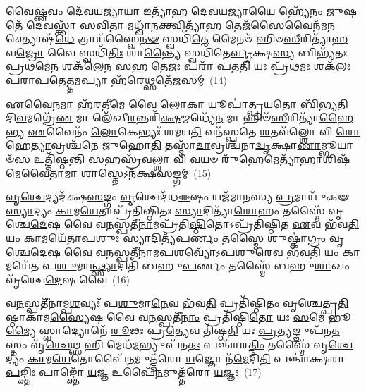 \-\ul{𑌵𑍈}\-\-\ul{𑌷𑍍𑌣}\-𑌵𑌂 𑌦𑍇᳴𑌵\-\ul{𑌯}\-𑌜𑍍𑌯𑌾\-\ul{𑌯𑌾} 𑌇𑌤𑍍𑌯𑌾᳴𑌹 𑌦𑍇𑌵\-\ul{𑌯}\-𑌜𑍍𑌯𑌾\-\ul{𑌯𑍈} 𑌹𑍍𑌯𑍇᳴𑌨𑌂 \ul{𑌜𑍁}\-𑌷𑌤𑍇᳴ \ul{𑌦𑍇}\-𑌵𑌸𑍍𑌤𑍍𑌵𑌾᳴ 𑌸\-\ul{𑌵𑌿}\-𑌤𑌾 𑌮𑌧𑍍𑌵𑌾᳴\-\ul{𑌨}\-𑌕𑍍𑌤𑍍𑌵𑌿𑌤𑍍𑌯𑌾᳴\-\ul{𑌹} 𑌤𑍇𑌜᳴\-\ul{𑌸𑍈}\-𑌵𑍈𑌨᳴𑌮\-\ul{𑌨}\-𑌕𑍍𑌤𑍍𑌯𑍋𑌷᳴\-\ul{𑌧𑍇} 𑌤𑍍𑌰𑌾𑌯᳴𑌸𑍍𑌵𑍈\-\ul{𑌨}\-\-\ul{𑍟} 𑌸𑍍𑌵𑌧𑌿᳴\-\ul{𑌤𑍇} 𑌮𑍈𑌨𑍞᳴ 𑌹𑌿𑍞\-\ul{𑌸𑍀}\-𑌰𑌿𑌤𑍍𑌯𑌾᳴\-\ul{𑌹} 𑌵\-\ul{𑌜𑍍𑌰𑍋} 𑌵𑍈 𑌸𑍍𑌵𑌧𑌿᳴\-\ul{𑌤𑌿𑌃} 𑌶𑌾\-\ul{𑌨𑍍𑌤𑍍𑌯𑍈} 𑌸𑍍𑌵𑌧𑌿᳴𑌤𑍇\-\ul{𑌰𑍍𑌵𑍃}\-𑌕𑍍𑌷\-\ul{𑌸𑍍𑌯} 𑌬𑌿𑌭𑍍𑌯᳴𑌤𑌃 𑌪𑍍𑌰\-\ul{𑌥}\-𑌮𑍇\-\ul{𑌨} 𑌶𑌕᳴𑌲𑍇𑌨 \ul{𑌸}\-𑌹 𑌤𑍇\-\ul{𑌜𑌃} 𑌪𑌰𑌾᳴ 𑌪𑌤\-\ul{𑌤𑌿} 𑌯𑌃 𑌪𑍍𑌰᳴\-\ul{𑌥}\-𑌮𑌃 𑌶𑌕᳴𑌲𑌃 𑌪\-\ul{𑌰𑌾}\-𑌪\-\ul{𑌤𑍇}\-𑌤𑍍𑌤𑌮𑌪𑍍𑌯𑌾 𑌹᳴\-\ul{𑌰𑍇}\-𑌥𑍍𑌸𑌤𑍇᳴𑌜𑌸𑌮𑍍~(14)

\-\ul{𑌏}\-𑌵𑍈\-\ul{𑌨}\-𑌮𑌾 𑌹᳴𑌰\-\ul{𑌤𑍀}\-𑌮𑍇 𑌵𑍈 \ul{𑌲𑍋}\-𑌕𑌾 𑌯𑍂𑌪𑌾॑𑌤𑍍𑌪𑍍𑌰\-\ul{𑌯}\-𑌤𑍋 𑌬𑌿᳴𑌭𑍍𑌯\-\ul{𑌤𑌿} 𑌦𑌿\-\ul{𑌵}\-𑌮𑌗𑍍𑌰𑍇᳴\-\ul{𑌣} 𑌮𑌾 𑌲𑍇᳴𑌖𑍀\-\ul{𑌰}\-𑌨𑍍𑌤𑌰𑌿᳴\-\ul{𑌕𑍍𑌷}\-𑌮𑍍𑌮𑌧𑍍𑌯𑍇᳴\-\ul{𑌨} 𑌮𑌾 𑌹𑌿𑍞᳴\-\ul{𑌸𑍀}\-𑌰𑌿𑌤𑍍𑌯𑌾᳴\-\ul{𑌹𑍈}\-𑌭𑍍𑌯 \ul{𑌏}\-𑌵𑍈𑌨𑌂᳴ \ul{𑌲𑍋}\-𑌕𑍇𑌭𑍍𑌯𑌃᳴ 𑌶𑌮𑌯\-\ul{𑌤𑌿} 𑌵𑌨᳴𑌸𑍍𑌪𑌤𑍇 \ul{𑌶}\-𑌤𑌵᳴𑌲𑍍\mbox{}\-\ul{𑌶𑍋} 𑌵𑌿 \ul{𑌰𑍋}\-𑌹𑍇\-\ul{𑌤𑍍𑌯𑌾}\-𑌵𑍍𑌰𑌶𑍍𑌚᳴𑌨𑍇 𑌜𑍁𑌹𑍋\-\ul{𑌤𑌿} 𑌤𑌸𑍍𑌮𑌾᳴\-\ul{𑌦𑌾}\-𑌵𑍍𑌰𑌶𑍍𑌚᳴𑌨𑌾\-\ul{𑌦𑍍𑌵𑍃}\-𑌕𑍍𑌷𑌾\-\ul{𑌣𑌾}\-𑌮𑍍𑌭𑍂𑌯𑌾𑍞᳴\-\ul{𑌸} 𑌉𑌤𑍍𑌤𑌿᳴𑌷𑍍𑌠𑌨𑍍𑌤𑌿 \ul{𑌸}\-𑌹𑌸𑍍𑌰᳴𑌵𑌲𑍍\mbox{}\-\ul{𑌶𑌾} 𑌵𑌿 \ul{𑌵}\-𑌯𑍞 𑌰𑍁᳴\-\ul{𑌹𑍇}\-𑌮𑍇𑌤𑍍𑌯𑌾᳴\-\ul{𑌹𑌾}\-𑌶𑌿𑌷᳴\-\ul{𑌮𑍇}\-𑌵𑍈𑌤𑌾𑌮𑌾 \ul{𑌶𑌾}\-𑌸𑍍𑌤𑍇\-𑌽𑌨᳴𑌕𑍍𑌷𑌸𑌙𑍍𑌗𑌮𑍍~(15)

\-\ul{𑌵𑍃}\-\-\ul{𑌶𑍍𑌚𑍇}\-𑌦𑍍𑌯𑌦᳴𑌕𑍍𑌷\-\ul{𑌸}\-𑌙𑍍𑌗𑌂 \ul{𑌵𑍃}\-𑌶𑍍𑌚𑍇𑌦᳴𑌧\-\ul{𑌈}\-𑌷𑌂 𑌯𑌜᳴𑌮𑌾𑌨𑌸𑍍𑌯 \ul{𑌪𑍍𑌰}\-𑌮𑌾𑌯𑍁᳴𑌕𑍟 \ul{𑌸𑍍𑌯𑌾}\-𑌦𑍍𑌯𑌂 \ul{𑌕𑌾}\-𑌮\-\ul{𑌯𑍇}\-𑌤𑌾𑌪𑍍𑌰᳴𑌤𑌿𑌷𑍍𑌠𑌿𑌤𑌃 \ul{𑌸𑍍𑌯𑌾}\-𑌦𑌿𑌤𑍍𑌯𑌾᳴\-\ul{𑌰𑍋}\-𑌹𑌂 𑌤𑌸𑍍𑌮𑍈᳴ 𑌵𑍃𑌶𑍍𑌚𑍇\-\ul{𑌦𑍇}\-𑌷 𑌵𑍈 𑌵\-\ul{𑌨}\-𑌸𑍍𑌪𑌤𑍀᳴\-\ul{𑌨𑌾}\-𑌮𑌪𑍍𑌰᳴𑌤𑌿\-\ul{𑌷𑍍𑌠𑌿}\-𑌤𑍋\-𑌽𑌪𑍍𑌰᳴𑌤𑌿𑌷𑍍𑌠𑌿𑌤 \ul{𑌏}\-𑌵 𑌭᳴𑌵\-\ul{𑌤𑌿} 𑌯𑌂 \ul{𑌕𑌾}\-𑌮𑌯𑍇᳴𑌤𑌾\-\ul{𑌪}\-𑌶𑍁𑌃 \ul{𑌸𑍍𑌯𑌾}\-𑌦𑌿𑌤𑍍𑌯᳴\-\ul{𑌪}\-𑌰𑍍𑌣𑌂 𑌤\-\ul{𑌸𑍍𑌮𑍈} 𑌶𑍁𑌷𑍍𑌕𑌾॑𑌗𑍍𑌰𑌂 𑌵𑍃𑌶𑍍𑌚𑍇\-\ul{𑌦𑍇}\-𑌷 𑌵𑍈 𑌵\-\ul{𑌨}\-𑌸𑍍𑌪𑌤𑍀᳴𑌨𑌾𑌮𑌪\-\ul{𑌶}\-𑌵𑍍𑌯𑍋᳴\-𑌽\-\ul{𑌪}\-𑌶𑍁\-\ul{𑌰𑍇}\-𑌵 𑌭᳴𑌵\-\ul{𑌤𑌿} 𑌯𑌂 \ul{𑌕𑌾}\-𑌮𑌯𑍇᳴𑌤 𑌪\-\ul{𑌶𑍁}\-𑌮𑌾\-\ul{𑌨𑍍𑌥𑍍𑌸𑍍𑌯𑌾}\-𑌦𑌿𑌤𑌿᳴ 𑌬𑌹𑍁\-\ul{𑌪}\-𑌰𑍍𑌣𑌂 𑌤𑌸𑍍𑌮𑍈᳴ 𑌬𑌹𑍁\-\ul{𑌶𑌾}\-𑌖𑌂 𑌵𑍃᳴𑌶𑍍𑌚𑍇\-\ul{𑌦𑍇}\-𑌷 𑌵𑍈~(16)

𑌵\-\ul{𑌨}\-𑌸𑍍𑌪𑌤𑍀᳴𑌨𑌾𑌮𑍍𑌪\-\ul{𑌶}\-𑌵𑍍𑌯𑌃᳴ 𑌪\-\ul{𑌶𑍁}\-𑌮𑌾\-\ul{𑌨𑍇}\-𑌵 𑌭᳴𑌵\-\ul{𑌤𑌿} 𑌪𑍍𑌰𑌤𑌿᳴𑌷𑍍𑌠𑌿𑌤𑌂 𑌵𑍃𑌶𑍍𑌚𑍇𑌤𑍍𑌪𑍍𑌰\-\ul{𑌤𑌿}\-𑌷𑍍𑌠𑌾𑌕𑌾᳴𑌮\-\ul{𑌸𑍍𑌯𑍈}\-𑌷 𑌵𑍈 𑌵\-\ul{𑌨}\-𑌸𑍍𑌪𑌤𑍀᳴\-\ul{𑌨𑌾𑌂} 𑌪𑍍𑌰𑌤𑌿᳴𑌷𑍍𑌠𑌿\-\ul{𑌤𑍋} 𑌯𑌃 \ul{𑌸}\-𑌮𑍇 𑌭𑍂\-\ul{𑌮𑍍𑌯𑍈} 𑌸𑍍𑌵𑌾𑌦𑍍𑌯𑍋𑌨𑍇᳴ \ul{𑌰𑍂}\-𑌢𑌃 𑌪𑍍𑌰\-\ul{𑌤𑍍𑌯𑍇}\-𑌵 𑌤𑌿᳴𑌷𑍍𑌠\-\ul{𑌤𑌿} 𑌯𑌃 \ul{𑌪𑍍𑌰}\-𑌤𑍍𑌯𑌙𑍍𑌙𑍁𑌪᳴𑌨\-\ul{𑌤}\-𑌸𑍍𑌤𑌂 𑌵𑍃᳴\-\ul{𑌶𑍍𑌚𑍇}\-𑌥𑍍𑌸 𑌹𑌿 𑌮𑍇𑌧᳴\-\ul{𑌮}\-𑌭𑍍𑌯𑍁𑌪᳴𑌨\-\ul{𑌤𑌃} 𑌪𑌞𑍍𑌚𑌾᳴𑌰\-\ul{𑌤𑍍𑌨𑌿𑌂} 𑌤𑌸𑍍𑌮𑍈᳴ 𑌵𑍃\-\ul{𑌶𑍍𑌚𑍇}\-𑌦𑍍𑌯𑌂 \ul{𑌕𑌾}\-𑌮\-\ul{𑌯𑍇}\-𑌤𑍋𑌪𑍈᳴\-\ul{𑌨}\-𑌮𑍁𑌤𑍍𑌤᳴𑌰𑍋 \ul{𑌯}\-𑌜𑍍𑌞𑍋 𑌨᳴\-\ul{𑌮𑍇}\-𑌦𑌿\-\ul{𑌤𑌿} 𑌪𑌞𑍍𑌚𑌾॑𑌕𑍍𑌷𑌰𑌾 \ul{𑌪}\-𑌙𑍍𑌕𑍍𑌤𑌿𑌃 𑌪𑌾𑌙𑍍𑌕𑍍𑌤𑍋᳴ \ul{𑌯}\-𑌜𑍍𑌞 𑌉𑌪𑍈᳴\-\ul{𑌨}\-𑌮𑍁𑌤𑍍𑌤᳴𑌰𑍋 \ul{𑌯}\-𑌜𑍍𑌞𑌃~(17)


